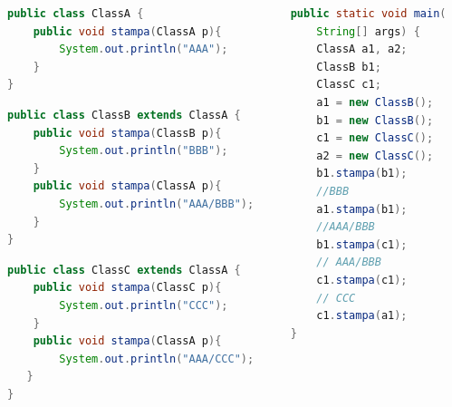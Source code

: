 \documentclass{beamer}
\begin{document}
\begin{frame}[fragile]
\begin{columns}
\begin{column}{0.6\textwidth}
\begin{lstlisting}[language=Java,escapechar=|]
public class ClassA {
    public void stampa(ClassA p){
        System.out.println("AAA");
    }
}
\end{lstlisting}
\begin{lstlisting}[language=Java,escapechar=|]
public class ClassB extends ClassA {
    public void stampa(ClassB p){
        System.out.println("BBB");
    }
    public void stampa(ClassA p){
        System.out.println("AAA/BBB");
    }
}
\end{lstlisting}
\begin{lstlisting}[language=Java,escapechar=|]
public class ClassC extends ClassA {
    public void stampa(ClassC p){
        System.out.println("CCC");
    }
    public void stampa(ClassA p){
        System.out.println("AAA/CCC");
   }
}
\end{lstlisting}
\end{column}
\begin{column}{0.4\textwidth}
\begin{lstlisting}[language=Java,escapechar=|]
public static void main(
    String[] args) {
    ClassA a1, a2;
    ClassB b1;
    ClassC c1;
    a1 = new ClassB();
    b1 = new ClassB();
    c1 = new ClassC();
    a2 = new ClassC();
    b1.stampa(b1); 
    //BBB
    a1.stampa(b1);  
    //AAA/BBB
    b1.stampa(c1); 
    // AAA/BBB
    c1.stampa(c1); 
    // CCC
    c1.stampa(a1); 
}
\end{lstlisting}
\end{column}
\end{columns}
\end{frame}
\end{document}
